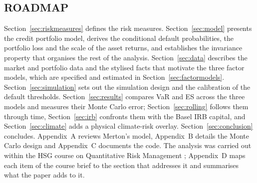 \subsection{ROADMAP}
\label{subsec:roadmap}

Section~\ref{sec:riskmeasures} defines the risk measures. Section~\ref{sec:model} presents the credit portfolio model, derives the conditional default probabilities, the portfolio loss and the scale of the asset returns, and establishes the invariance property that organises the rest of the analysis. Section~\ref{sec:data} describes the market and portfolio data and the stylised facts that motivate the three factor models, which are specified and estimated in Section~\ref{sec:factormodels}. Section~\ref{sec:simulation} sets out the simulation design and the calibration of the default thresholds. Section~\ref{sec:results} compares VaR and ES across the three models and measures their Monte Carlo error; Section~\ref{sec:rolling} follows them through time, Section~\ref{sec:irb} confronts them with the Basel IRB capital, and Section~\ref{sec:climate} adds a physical climate-risk overlay. Section~\ref{sec:conclusion} concludes. Appendix~A reviews Merton's model, Appendix~B details the Monte Carlo design and Appendix~C documents the code. The analysis was carried out within the HSG course on Quantitative Risk Management \citep{DeGiorgiFilkova26}; Appendix~D maps each item of the course brief to the section that addresses it and summarises what the paper adds to it.
